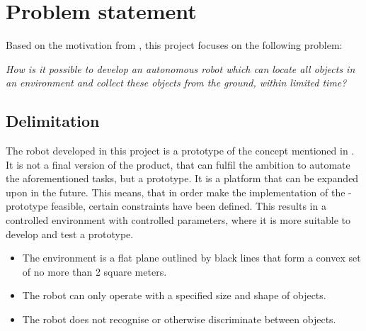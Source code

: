 \section{Problem statement} \label{sec:problem_statement}
Based on the motivation from , this project focuses on the following problem:

\begin{center}
\textit{How is it possible to develop an autonomous robot which can locate all objects in an environment and collect these objects from the ground, within limited time?}
\end{center}

\subsection{Delimitation} \label{sec:delimitation}
The robot developed in this project is a prototype of the concept mentioned in . It is not a final version of the product, that can fulfil the ambition to automate the aforementioned tasks, but a prototype. It is a platform that can be expanded upon in the future. This means, that in order make the implementation of the \projname{}-prototype feasible, certain constraints have been defined. This results in a controlled environment with controlled parameters, where it is more suitable to develop and test a prototype.

\begin{itemize}
\item The environment is a flat plane outlined by black lines that form a convex set of no more than 2 square meters.
\item The robot can only operate with a specified size and shape of objects.
\item The robot does not recognise or otherwise discriminate between objects.
\end{itemize}

